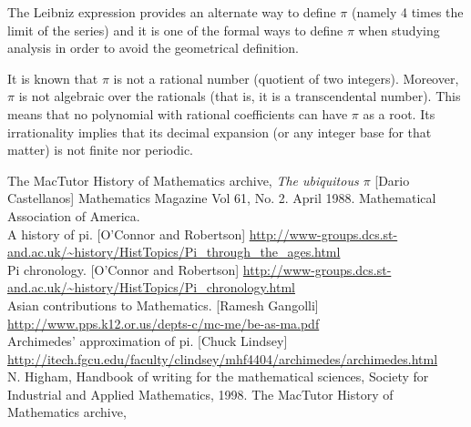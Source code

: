 \documentclass{article}
\newcommand{\<}{\langle}
\renewcommand{\>}{\rangle}
\begin{document}
The Leibniz expression provides an alternate way to define $\pi$ (namely 4 times the limit of the series) and it is one of the formal ways to define $\pi$ when studying analysis in order to avoid the geometrical definition.

It is known that $\pi$ is not a rational number (quotient of two integers). Moreover, $\pi$ is not algebraic over the rationals (that is, it is a transcendental number). This means that no polynomial with rational coefficients can have $\pi$ as a root.  Its irrationality implies that its decimal expansion (or any integer base for that matter) is not finite nor periodic.

\begin{thebibliography}{99}
 The MacTutor History of Mathematics archive, 
\emph{The ubiquitous $\pi$} [Dario Castellanos] Mathematics Magazine Vol 61, No. 2. April 1988. Mathematical Association of America.\\
 A history of pi. [O'Connor and Robertson]
\url{http://www-groups.dcs.st-and.ac.uk/~history/HistTopics/Pi_through_the_ages.html}\\
 Pi chronology. [O'Connor and Robertson]
\url{http://www-groups.dcs.st-and.ac.uk/~history/HistTopics/Pi_chronology.html}\\
 Asian contributions to Mathematics. [Ramesh Gangolli]
\url{http://www.pps.k12.or.us/depts-c/mc-me/be-as-ma.pdf}\\
 Archimedes' approximation of pi. [Chuck Lindsey]
\url{http://itech.fgcu.edu/faculty/clindsey/mhf4404/archimedes/archimedes.html}\\
 N. Higham, Handbook of writing for the mathematical sciences, Society for Industrial and Applied Mathematics, 1998.
The MacTutor History of Mathematics archive,
\end{thebibliography}
\end{document}

